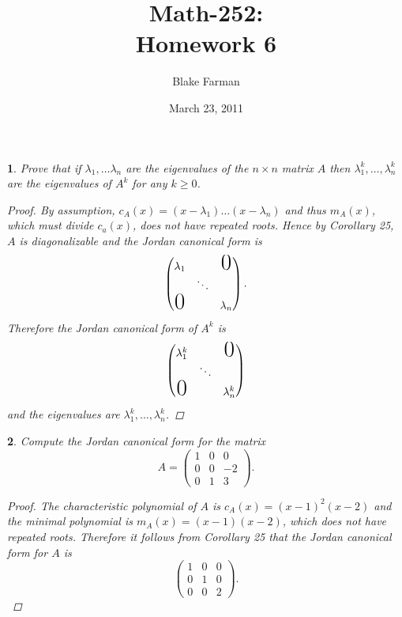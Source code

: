 \documentclass[10pt]{amsart}
\author{Blake Farman}
\title{Math-252:\\Homework 6}
\date{March 23, 2011}
\begin{document}
\maketitle

\newtheorem{thm}{}

\begin{thm}
  \label{Ex1}
  Prove that if $\lambda_1, \ldots \lambda_n$ are the eigenvalues of the $n \times n$ matrix $A$ then $\lambda_1^k, \ldots, \lambda_n^k$ are the eigenvalues of $A^k$ for any $k \geq 0$.
    \begin{proof}
    By assumption, $c_A(x) = (x - \lambda_1)\ldots(x - \lambda_n)$ and thus $m_A(x)$, which must divide $c_a(x)$, does not have repeated roots.
    Hence by Corollary 25, $A$ is diagonalizable and the Jordan canonical form is 
    $$
    \begin{pmatrix}
      \lambda_1  & & \text{\huge{0}}\\
       & \ddots & \\ 
      \text{\huge{0}} & & \lambda_n
    \end{pmatrix}.
    $$
    Therefore the Jordan canonical form of $A^k$ is 
    $$
    \begin{pmatrix}
      \lambda_1^k  & & \text{\huge{0}}\\
       & \ddots & \\ 
      \text{\huge{0}} & & \lambda_n^k
    \end{pmatrix}
    $$
    and the eigenvalues are $\lambda_1^k, \ldots, \lambda_n^k$.
  \end{proof}
\end{thm}

\begin{thm}
  \label{Ex2}
  Compute the Jordan canonical form for the matrix
  $$
  A =  \begin{pmatrix}
    1 & 0 & 0\\
    0 & 0 & -2\\
    0 & 1 & 3
  \end{pmatrix}.
  $$
  \begin{proof}
    The characteristic polynomial of $A$ is $c_A(x) = (x-1)^2(x-2)$ and the minimal polynomial is $m_A(x) = (x-1)(x-2)$, which does not have repeated roots.
    Therefore it follows from Corollary 25 that the Jordan canonical form for $A$ is 
    $$
    \begin{pmatrix}
      1 & 0 & 0\\
      0 & 1 & 0\\
      0 & 0 & 2
    \end{pmatrix}.
    $$
  \end{proof}
\end{thm}
\end{document}
